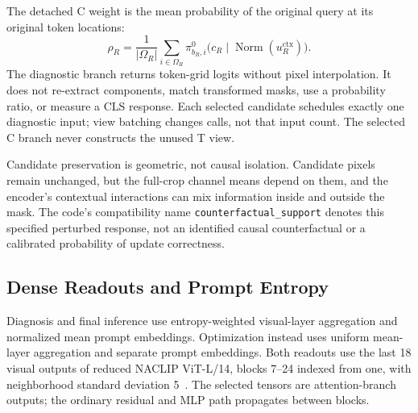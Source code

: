 The detached C weight is the mean probability of the original query at its original token locations:
\begin{equation}
\rho_R=\frac{1}{|\Omega_R|}
\sum_{i\in\Omega_R}\pi^0_{b_R,i}
\bigl(c_R\mid\operatorname{Norm}(u_R^{\mathrm{ctx}})\bigr).
\label{eq:app-C}
\end{equation}
The diagnostic branch returns token-grid logits without pixel interpolation. It does not re-extract components, match transformed masks, use a probability ratio, or measure a CLS response. Each selected candidate schedules exactly one diagnostic input; view batching changes calls, not that input count. The selected C branch never constructs the unused T view.

Candidate preservation is geometric, not causal isolation. Candidate pixels remain unchanged, but the full-crop channel means depend on them, and the encoder's contextual interactions can mix information inside and outside the mask. The code's compatibility name \texttt{counterfactual\_support} denotes this specified perturbed response, not an identified causal counterfactual or a calibrated probability of update correctness.

\subsection{Dense Readouts and Prompt Entropy}
\label{app:readout}
Diagnosis and final inference use entropy-weighted visual-layer aggregation and normalized mean prompt embeddings. Optimization instead uses uniform mean-layer aggregation and separate prompt embeddings. Both readouts use the last 18 visual outputs of reduced NACLIP ViT-L/14, blocks 7--24 indexed from one, with neighborhood standard deviation 5~\cite{hajimiri2025naclip}. The selected tensors are attention-branch outputs; the ordinary residual and MLP path propagates between blocks.

